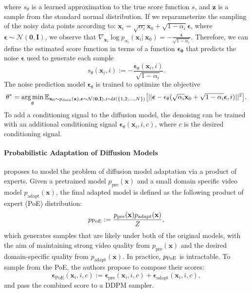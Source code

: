 where $s_\theta$ is a learned approximation to the true score function $s$, and $\mathbf{z}$ is a sample from the standard normal distribution.
%
If we reparameterize the sampling of the noisy data points according to: $\mathbf{x}_i = \sqrt{\alpha_i}\mathbf{x}_0 + \sqrt{1 - \alpha_i}\boldsymbol\epsilon$, where $\boldsymbol\epsilon \sim \mathcal{N}(\mathbf{0}, \mathbf{I})$, we observe that
$
\nabla_{\mathbf{x}_i} \log p_{\alpha_i}(\mathbf{x}_i |\ \mathbf{x}_0) = - \frac{\boldsymbol\epsilon}{\sqrt{1 - \alpha_i}}.$
%
Therefore, we can define the estimated score function 
in terms of a function $\mathbf{\epsilon_\theta}$ that predicts the noise $\boldsymbol\epsilon$ used to generate each sample
\begin{equation}
    s_\theta(\mathbf{x}_i, i) := -\frac{\mathbf{\epsilon}_\theta (\mathbf{x}_i, i)}{\sqrt{1 - \alpha_i}}.
\end{equation}
The noise prediction model $\mathbf{\epsilon}_\theta$ is trained to optimize the objective
\begin{equation}
    \mathbf{\theta}^* = \operatorname*{arg\,min}_{\mathbf{\theta}} \mathbb{E}_{\mathbf{x}_0 \sim p_\mathrm{data}(\mathbf{x}),{\boldsymbol\epsilon \sim \mathcal{N}(\mathbf{0}, \mathbf{I})}, i \sim \mathcal{U}(\{1, 2, \dots, N\})} \big[ ||\boldsymbol\epsilon -  \epsilon_\theta (\sqrt{\alpha_i}\mathbf{x}_0 + \sqrt{1 - \alpha_i}\boldsymbol\epsilon, i)||^2  \big] \label{eq:diffusion_noise_obj}.
\end{equation}
To add a conditioning signal to the diffusion model, the denoising can be trained with an additional conditioning signal $\mathbf{\epsilon}_\theta (\mathbf{x}_i, i, c)$, where $c$ is the desired conditioning signal.


\paragraph{Probabilistic Adaptation of Diffusion Models} \cite{yang2024probabilistic} proposes to model the problem of diffusion model adaptation via a product of experts. Given a pretrained model $p_{\text{pre}}(\mathbf{x})$ and a small domain specific video model $p_{\text{adapt}}(\mathbf{x})$, the final adapted model is defined as the following product of expert (PoE) distribution:
$$p_\textnormal{PoE} := \frac{p_{\text{pre}}(\mathbf{x})p_{\text{adapt}}(\mathbf{x})}{Z},$$
 which generates samples that are likely under both of the original models, with the aim of maintaining strong video quality from $p_{\text{pre}}(\mathbf{x})$ and the desired domain-specific quality from $p_{\text{adapt}}(\mathbf{x})$.
In practice, $p_\textnormal{PoE}$ is intractable. To sample from the PoE, the authors propose to compose their scores:
$$ \mathbf{\epsilon}_{\text{PoE}} (\mathbf{x}_i, i, c) := 
\mathbf{\epsilon}_{\text{pre}} (\mathbf{x}_i, i, c) + \mathbf{\epsilon}_{\text{adapt}} (\mathbf{x}_i, i, c), $$
and pass the combined score to a  DDPM sampler.



